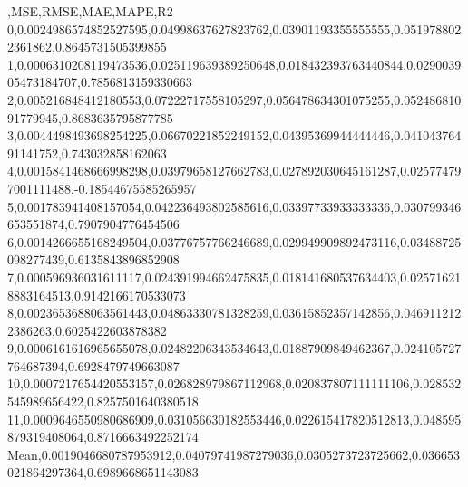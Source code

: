 ,MSE,RMSE,MAE,MAPE,R2
0,0.0024986574852527595,0.04998637627823762,0.03901193355555555,0.0519788022361862,0.8645731505399855
1,0.0006310208119473536,0.025119639389250648,0.018432393763440844,0.029003905473184707,0.7856813159330663
2,0.005216848412180553,0.07222717558105297,0.056478634301075255,0.05248681091779945,0.8683635795877785
3,0.0044498493698254225,0.06670221852249152,0.04395369944444446,0.04104376491141752,0.743032858162063
4,0.0015841468666998298,0.03979658127662783,0.027892030645161287,0.025774797001111488,-0.18544675585265957
5,0.001783941408157054,0.042236493802585616,0.03397733933333336,0.030799346653551874,0.7907904776454506
6,0.0014266655168249504,0.03776757766246689,0.029949909892473116,0.03488725098277439,0.6135843896852908
7,0.000596936031611117,0.024391994662475835,0.018141680537634403,0.025716218883164513,0.9142166170533073
8,0.0023653688063561443,0.04863330781328259,0.03615852357142856,0.0469112122386263,0.6025422603878382
9,0.0006161616965655078,0.02482206343534643,0.01887909849462367,0.024105727764687394,0.6928479749663087
10,0.0007217654420553157,0.026828979867112968,0.020837807111111106,0.028532545989656422,0.8257501640380518
11,0.0009646550980686909,0.031056630182553446,0.022615417820512813,0.048595879319408064,0.8716663492252174
Mean,0.0019046680787953912,0.04079741987279036,0.0305273723725662,0.036653021864297364,0.6989668651143083
